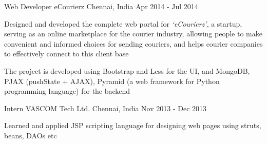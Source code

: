 \begin{cventries}
  \cventry
    {Web Developer} %
    {eCourierz} %
    {Chennai, India} %
    {Apr 2014 - Jul 2014} %
    {
      \begin{cvitems}
      \item{Designed and developed the complete web portal for \textit{‘eCourierz’}, a startup, serving as an online marketplace for the courier industry, allowing people to make convenient and informed choices for sending couriers, and helps courier companies to effectively connect to this client  base}
      \item{The project is developed using Bootstrap and Less for the UI, and MongoDB, PJAX (pushState + AJAX), Pyramid (a web framework for Python programming language) for the backend}
      \end{cvitems}
    }

  \cventry
    {Intern} %
    {VASCOM Tech Ltd.} %
    {Chennai, India} %
    {Nov 2013 - Dec 2013} %
    {
      \begin{cvitems}
        \item{Learned and applied JSP scripting language for designing web pages using struts, beans, DAOs etc}
      \end{cvitems}
    }


\end{cventries}
